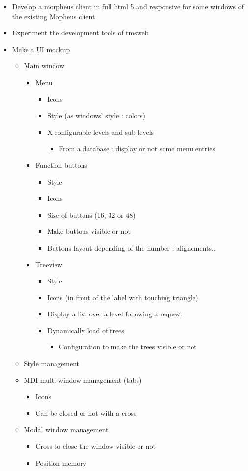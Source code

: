 \documentclass[a4paper, 12pt, french]{article}
\newcommand{\bdot}{\item[\color{ssiYellow}\ding{108}]}
\newcommand{\bdotoutlined}{\item[\color{ssiYellow}\ding{109}]}
\newcommand{\bsquare}{\item[\color{ssiYellow}\ding{110}]}
\newcommand{\bsquareoutlined}{\item[\color{ssiYellow}\ding{111}]}
\newcommand{\bdiamond}{\item[\color{ssiYellow}\ding{117}]}
\begin{document}
					\begin{itemize}
						\bdot{Develop a morpheus client in full \gls{html} 5 and responsive for some windows of the existing Mopheus client}
						\bdot{Experiment the development tools of \gls{tmsweb}}
						\bdot{Make a UI mockup}
							\begin{itemize}
								\bdotoutlined{Main window}
									\begin{itemize}
										\bsquare{Menu}
											\begin{itemize}
												\bsquareoutlined{Icons}
												\bsquareoutlined{Style (as windows' style : colors)}
												\bsquareoutlined{X configurable levels and sub levels}
													\begin{itemize}
														\bdiamond{From a database : display or not some menu entries}
													\end{itemize}
											\end{itemize}
										\bsquare{Function buttons}
											\begin{itemize}
												\bsquareoutlined{Style}
												\bsquareoutlined{Icons}
												\bsquareoutlined{Size of buttons (16, 32 or 48)}
												\bsquareoutlined{Make buttons visible or not}
												\bsquareoutlined{Buttons layout depending of the number : alignements..}
											\end{itemize}
										\bsquare{Treeview}
											\begin{itemize}
												\bsquareoutlined{Style}
												\bsquareoutlined{Icons (in front of the label with touching triangle)}
												\bsquareoutlined{Display a list over a level following a request}
												\bsquareoutlined{Dynamically load of trees}
													\begin{itemize}
														\bdiamond{Configuration to make the trees visible or not}
													\end{itemize}
											\end{itemize}
									\end{itemize}
								\bdotoutlined{Style management}
								\bdotoutlined{MDI multi-window management (tabs)}
									\begin{itemize}
										\bsquare{Icons}
										\bsquare{Can be closed or not with a cross}
									\end{itemize}
								\bdotoutlined{Modal window management}
									\begin{itemize}
										\bsquare{Cross to close the window visible or not}
										\bsquare{Position memory}

\end{itemize}
\end{itemize}
\end{itemize}
\end{document}

